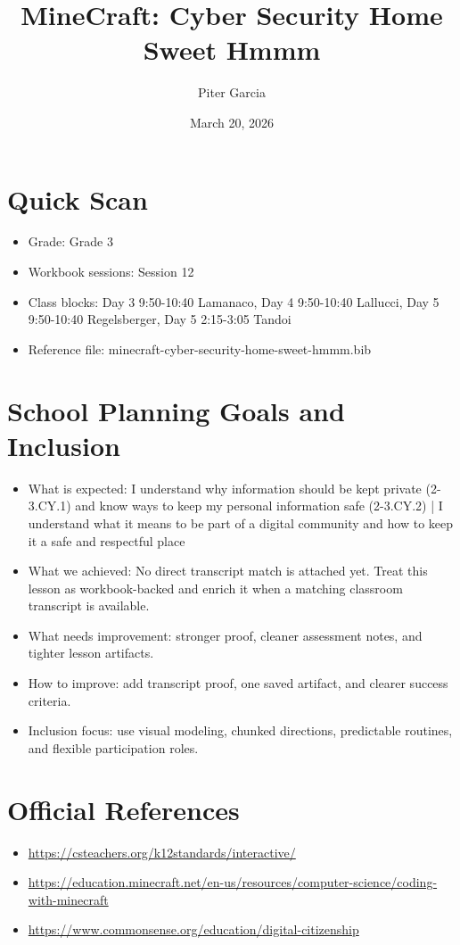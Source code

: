 \documentclass[11pt]{article}
\title{MineCraft: Cyber Security Home Sweet Hmmm}
\author{Piter Garcia}
\date{March 20, 2026}
\begin{document}
    \maketitle
    \section*{Quick Scan}
    \begin{itemize}[leftmargin=*]
    \item Grade: Grade 3
    \item Workbook sessions: Session 12
    \item Class blocks: Day 3 9:50-10:40 Lamanaco, Day 4 9:50-10:40 Lallucci, Day 5 9:50-10:40 Regelsberger, Day 5 2:15-3:05 Tandoi
    \item Reference file: minecraft-cyber-security-home-sweet-hmmm.bib
    \end{itemize}
    \section*{School Planning Goals and Inclusion}
    \begin{itemize}[leftmargin=*]
    \item What is expected: I understand why information should be kept private (2-3.CY.1) and know ways to keep my personal information safe (2-3.CY.2) | I understand what it means to be part of a digital community and how to keep it a safe and respectful place
    \item What we achieved: No direct transcript match is attached yet. Treat this lesson as workbook-backed and enrich it when a matching classroom transcript is available.
    \item What needs improvement: stronger proof, cleaner assessment notes, and tighter lesson artifacts.
    \item How to improve: add transcript proof, one saved artifact, and clearer success criteria.
    \item Inclusion focus: use visual modeling, chunked directions, predictable routines, and flexible participation roles.
    \end{itemize}
    \section*{Official References}
    \begin{itemize}[leftmargin=*]
    \item \url{https://csteachers.org/k12standards/interactive/}
\item \url{https://education.minecraft.net/en-us/resources/computer-science/coding-with-minecraft}
\item \url{https://www.commonsense.org/education/digital-citizenship}

    \end{itemize}
    
\end{document}
